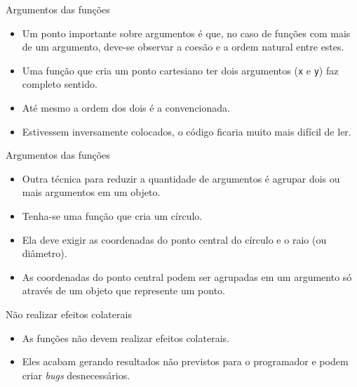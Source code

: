 \documentclass[11pt]{beamer}
\begin{document}
  \begin{frame}[fragile]{Argumentos das funções}
    \begin{itemize}
      \item Um ponto importante sobre argumentos é que, no caso de funções com mais de um argumento, deve-se observar a coesão e a ordem natural entre estes.
      \item Uma função que cria um ponto cartesiano ter dois argumentos (\verb|x| e \verb|y|) faz completo sentido.
      \item Até mesmo a ordem dos dois é a convencionada.
      \item Estivessem inversamente colocados, o código ficaria muito mais difícil de ler.
    \end{itemize}
  \end{frame}

  \begin{frame}{Argumentos das funções}
    \begin{itemize}
      \item Outra técnica para reduzir a quantidade de argumentos é agrupar dois ou mais argumentos em um objeto.
      \item Tenha-se uma função que cria um círculo.
      \item Ela deve exigir as coordenadas do ponto central do círculo e o raio (ou diâmetro).
      \item As coordenadas do ponto central podem ser agrupadas em um argumento só através de um objeto que represente um ponto.
    \end{itemize}
  \end{frame}

  \begin{frame}{Não realizar efeitos colaterais}
    \begin{itemize}
      \item As funções não devem realizar efeitos colaterais.
      \item Eles acabam gerando resultados não previstos para o programador e podem criar \textit{bugs} desnecessários.
    \end{itemize}
  \end{frame}
\end{document}
